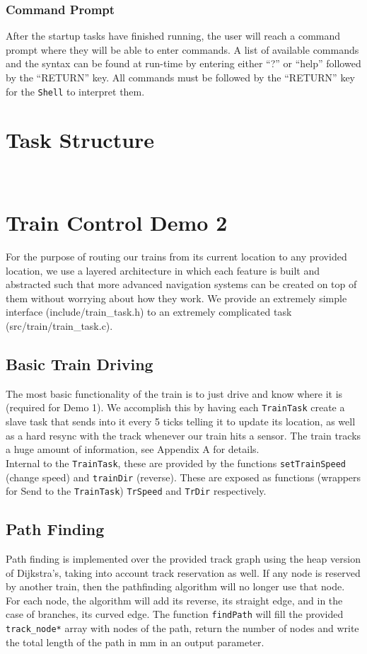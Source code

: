 \documentclass[12pt]{article}
\begin{document}
\subsubsection{Command Prompt}
After the startup tasks have finished running, the user will reach a command prompt where they will be able to enter commands.  A list of available commands and the syntax can be found at run-time by entering either ``?'' or ``help'' followed by the ``RETURN'' key.  All commands must be followed by the ``RETURN'' key for the {\tt Shell} to interpret them.
\\[2\baselineskip]
\section{Task Structure}
\\[2\baselineskip]
\section{Train Control Demo 2}
For the purpose of routing our trains from its current location to any provided location, we use a layered architecture
in which each feature is built and abstracted such that more advanced navigation systems can be created on top of them
without worrying about how they work. We provide an extremely simple interface (include/train\_task.h) to an extremely
complicated task (src/train/train\_task.c).

\subsection{Basic Train Driving}
The most basic functionality of the train is to just drive and know where it is (required for Demo 1). We accomplish
this by having each \texttt{TrainTask} create a slave task that sends into it every 5 ticks telling it to update its
location, as well as a hard resync with the track whenever our train hits a sensor. The train tracks a huge amount of
information, see Appendix A for details.
\\
Internal to the \texttt{TrainTask}, these are provided by the functions \texttt{setTrainSpeed} (change speed) and
\texttt{trainDir} (reverse). These are exposed as functions (wrappers for Send to the \texttt{TrainTask})
\texttt{TrSpeed} and \texttt{TrDir} respectively.

\subsection{Path Finding}
Path finding is implemented over the provided track graph using the heap version of Dijkstra's, taking into account
track reservation as well. If any node is reserved by another train, then the pathfinding algorithm will no longer use
that node. For each node, the algorithm will add its reverse, its straight edge, and in the case of branches, its curved
edge. The function \texttt{findPath} will fill the provided \texttt{track\_node*} array with nodes of the path, return
the number of nodes and write the total length of the path in mm in an output parameter.
\end{document}
